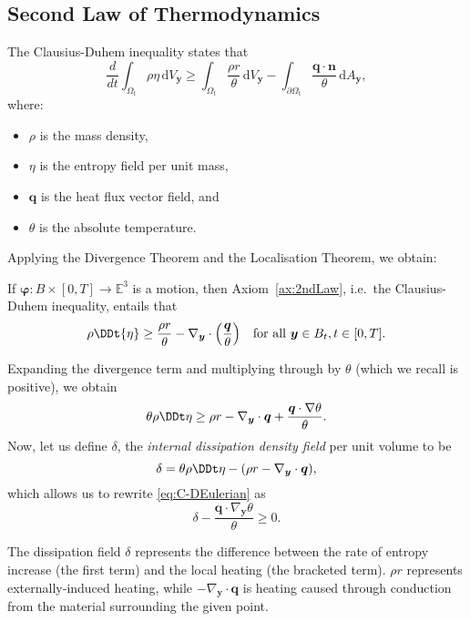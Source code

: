 \documentclass[
  letterpaper,
  DIV=11,
  numbers=noendperiod]{scrreprt}
\theoremstyle{plain}
\theoremstyle{remark}
\begin{document}
\subsection{Second Law of
Thermodynamics}\label{second-law-of-thermodynamics}

The Clausius-Duhem inequality states that
\[\frac{d}{dt}\int_{\Omega_t} \rho\eta{\,{\mathrm{d}}V_{{\boldsymbol{y}}}}\geq \int_{\Omega_t}\frac{\rho r}{\theta}{\,{\mathrm{d}}V_{{\boldsymbol{y}}}}-\int_{\partial\Omega_t}\frac{{\boldsymbol{q}}\cdot{\boldsymbol{n}}}{\theta}{\,{\mathrm{d}}A_{{\boldsymbol{y}}}},\]
where:

\begin{itemize}
\item
  \(\rho\) is the mass density,
\item
  \(\eta\) is the entropy field per unit mass,
\item
  \({\boldsymbol{q}}\) is the heat flux vector field, and
\item
  \(\theta\) is the absolute temperature.
\end{itemize}

Applying the Divergence Theorem and the Localisation Theorem, we obtain:

If \({\boldsymbol{\varphi}}:B\times[0,T]\to{\mathbb{E}}^3\) is a motion,
then Axiom~\hyperref[ax:2ndLaw]{{[}ax:2ndLaw{]}}, i.e.~the
Clausius-Duhem inequality, entails that
\[\rho\DDt{\eta}\geq \frac{\rho r}{\theta}-\nabla_{\boldsymbol{y}}\cdot\Big(\frac{\boldsymbol{q}}\theta\Big)\quad\text{for all }{\boldsymbol{y}}\in B_t, t\in[0,T].\]

Expanding the divergence term and multiplying through by \(\theta\)
(which we recall is positive), we obtain \[\label{eq:C-DEulerian}
  \theta\rho\DDt\eta\geq \rho r-\nabla_{\boldsymbol{y}}\cdot{\boldsymbol{q}}+\frac{{\boldsymbol{q}}\cdot\nabla\theta}{\theta}.\]
Now, let us define \(\delta\), the \emph{internal dissipation density
field} per unit volume to be
\[\delta = \theta\rho\DDt\eta-(\rho r-\nabla_{\boldsymbol{y}}\cdot{\boldsymbol{q}}),\]
which allows us to rewrite
\hyperref[eq:C-DEulerian]{{[}eq:C-DEulerian{]}} as
\[\label{eq:C-DEulerian2}
  \delta-\frac{{\boldsymbol{q}}\cdot\nabla_{\boldsymbol{y}}\theta}{\theta}\geq0.\]

The dissipation field \(\delta\) represents the difference between the
rate of entropy increase (the first term) and the local heating (the
bracketed term). \(\rho r\) represents externally-induced heating, while
\(-\nabla_{\boldsymbol{y}}\cdot{\boldsymbol{q}}\) is heating caused
through conduction from the material surrounding the given point.
\end{document}
